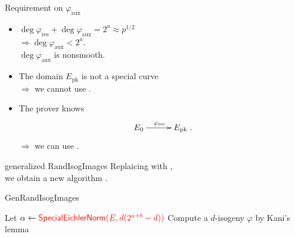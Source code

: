 \begin{frame}{Requirement on $\varphi_\mathrm{aux}$}
    \begin{itemize}
        \setlength{\itemsep}{10pt}
        \item $\deg\varphi_\mathrm{res} + \deg\varphi_\mathrm{aux} = 2^a \approx p^{1/2}$\\[3pt]
            $\Rightarrow \deg\varphi_\mathrm{aux} < 2^a$.\\[3pt]
            \hphantom{$\Rightarrow$} $\deg\varphi_\mathrm{aux}$ is nonsmooth.
        \item The domain $E_\mathrm{pk}$ is not a special curve\\[3pt]
            $\Rightarrow$ we cannot use .
        \item The prover knows
                \begin{align*}
                    \xymatrix@C=30pt{
                        E_0 \ar[r]^{\varphi_\mathrm{sec}} & E_\mathrm{pk}
                    }.
                \end{align*}
            $\Rightarrow$ we can use .
    \end{itemize}

\end{frame}

\begin{frame}{generalized RandIsogImages}
    Replaicing  with ,\\
    we obtain a new algorithm .

    \vspace{10pt}
    \begin{algorithm}[H]
        \caption{\textsf{GenRandIsogImages}}
        \BlankLine
        Let $\alpha \leftarrow \textcolor{red}{\textsf{SpecialEichlerNorm}(E, d(2^{a+b} - d))}$\;
        Compute a $d$-isogeny $\varphi$ by Kani's lemma\;
        \Return{$\varphi$}\;
    \end{algorithm}
\end{frame}

